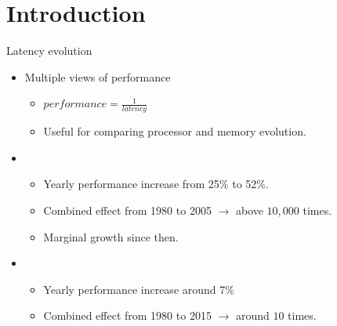 \section{Introduction}

\begin{frame}[t]{Latency evolution}
\begin{itemize}
  \item Multiple views of performance
    \begin{itemize}
      \item $performance = \frac{1}{latency}$
      \item Useful for comparing processor and memory evolution.
    \end{itemize}

  \item {}
    \begin{itemize}
      \item Yearly performance increase from 25\% to 52\%.
      \item Combined effect from 1980 to 2005 $\rightarrow$ above $10,000$ times.
      \item Marginal growth since then.
    \end{itemize}

  \item {}
    \begin{itemize}
      \item Yearly performance increase around 7\%
      \item Combined effect from 1980 to 2015 $\rightarrow$ around $10$ times.
    \end{itemize}
\end{itemize}
\end{frame}

